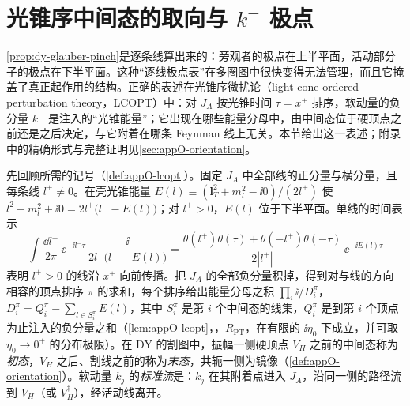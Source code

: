 \section{光锥序中间态的取向与 \texorpdfstring{$k^-$}{k-} 极点}\label{sec:dy-orientation}

\cref{prop:dy-glauber-pinch}是逐条线算出来的：旁观者的极点在上半平面，活动部分子的极点在下半平面。这种“逐线极点表”在多圈图中很快变得无法管理，而且它掩盖了真正起作用的结构。正确的表述在光锥序微扰论（light-cone ordered perturbation theory，LCOPT）中：对 $J_A$ 按光锥时间 $\tau=x^+$ 排序，软动量的负分量 $k^-$ 是注入的“光锥能量”；它出现在哪些能量分母中，由中间态位于硬顶点之前还是之后决定，与它附着在哪条 Feynman 线上无关。本节给出这一表述；附录中的精确形式与完整证明见\cref{sec:appO-orientation}。

先回顾所需的记号（\cref{def:appO-lcopt}）。固定 $J_A$ 中全部线的正分量与横分量，且每条线 $l^+\neq0$。在壳光锥能量 $E(l)\equiv(\mathbf l_T^2+m_l^2-\ii0)/(2l^+)$ 使 $l^2-m_l^2+\ii0=2l^+\big(l^--E(l)\big)$；对 $l^+>0$，$E(l)$ 位于下半平面。单线的时间表示
\begin{equation}\label{eq:dy-lc-fourier}
\int\frac{\dd l^-}{2\pi}\,\ee^{-\ii l^-\tau}\,\frac{\ii}{2l^+\big(l^--E(l)\big)}=\frac{\theta(l^+)\theta(\tau)+\theta(-l^+)\theta(-\tau)}{2|l^+|}\,\ee^{-\ii E(l)\tau}
\end{equation}
表明 $l^+>0$ 的线沿 $x^+$ 向前传播。把 $J_A$ 的全部负分量积掉，得到对与线的方向相容的顶点排序 $\pi$ 的求和，每个排序给出能量分母之积 $\prod_i\ii/D^\pi_i$，$D^\pi_i=Q^\pi_i-\sum_{l\in S^\pi_i}E(l)$，其中 $S^\pi_i$ 是第 $i$ 个中间态的线集，$Q^\pi_i$ 是到第 $i$ 个顶点为止注入的负分量之和（\cref{lem:appO-lcopt}，\tagR，$R_{\mathrm{PT}}$，在有限的 $\ii\eta_0$ 下成立，并可取 $\eta_0\to0^+$ 的分布极限）。在 DY 的割图中，振幅一侧硬顶点 $V_H$ 之前的中间态称为\emph{初态}，$V_H$ 之后、割线之前的称为\emph{末态}，共轭一侧为镜像（\cref{def:appO-orientation}）。软动量 $k_j$ 的\emph{标准流}是：$k_j$ 在其附着点进入 $J_A$，沿同一侧的路径流到 $V_H$（或 $V_H^\dagger$），经活动线离开。

